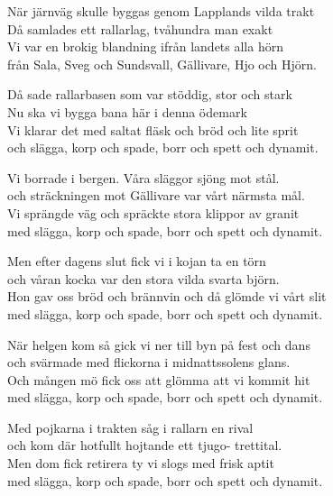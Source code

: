 \vspace{10pt}
När järnväg skulle byggas genom Lapplands vilda trakt\\
Då samlades ett rallarlag, tvåhundra man exakt\\
Vi var en brokig blandning ifrån landets alla hörn\\
från Sala, Sveg och Sundsvall, Gällivare, Hjo och Hjörn.\par
\vspace{10pt}
Då sade rallarbasen som var stöddig, stor och stark\\
Nu ska vi bygga bana här i denna ödemark\\
Vi klarar det med saltat fläsk och bröd och lite sprit\\
och slägga, korp och spade, borr och spett och dynamit.\par
\vspace{10pt}
Vi borrade i bergen. Våra släggor sjöng mot stål.\\
och sträckningen mot Gällivare var vårt närmsta mål.\\
Vi sprängde väg och spräckte stora klippor av granit\\
med slägga, korp och spade, borr och spett och dynamit.\par
\vspace{10pt}
Men efter dagens slut fick vi i kojan ta en törn\\
och våran kocka var den stora vilda svarta björn.\\
Hon gav oss bröd och brännvin och då glömde vi vårt slit\\
med slägga, korp och spade, borr och spett och dynamit.\par
\vspace{10pt}
När helgen kom så gick vi ner till byn på fest och dans\\
och svärmade med flickorna i midnattssolens glans.\\
Och mången mö fick oss att glömma att vi kommit hit\\
med slägga, korp och spade, borr och spett och dynamit.\par
\vspace{10pt}
Med pojkarna i trakten såg i rallarn en rival\\
och kom där hotfullt hojtande ett tjugo- trettital.\\
Men dom fick retirera ty vi slogs med frisk aptit\\
med slägga, korp och spade, borr och spett och dynamit.\par
